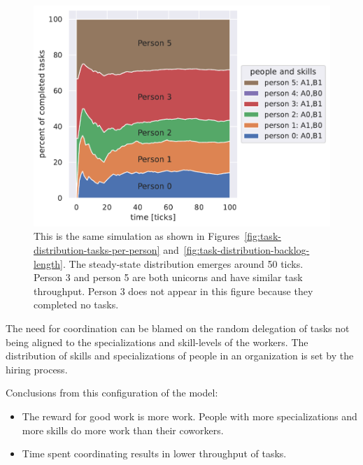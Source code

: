 \begin{figure}[H] %
\centering
\includegraphics[width=1\textwidth]{images/task_distribution_percent_of_tasks_per_person_simCount1_skills2_levels1_taskduration1_people6_social0_ticks100.pdf}
\caption{This is the same simulation as shown in Figures~\ref{fig:task-distribution-tasks-per-person} and~\ref{fig:task-distribution-backlog-length}. The steady-state distribution emerges around 50 ticks. Person 3 and person 5 are both unicorns and have similar task throughput. Person 3 does not appear in this figure because they completed no tasks.}
\label{fig:task-distribution-percent-of-tasks}
\end{figure}






The need for coordination can be blamed on the random delegation of tasks not being aligned to the specializations and skill-levels of the workers. 
The distribution of skills and specializations of people in an organization is set by the hiring process.



\begin{samepage}
Conclusions from this configuration of the model:
\begin{itemize}
    \item The reward for good work is more work. People with more specializations and more skills do more work than their coworkers.
    \item Time spent coordinating results in lower throughput of tasks.
\end{itemize}
\end{samepage}

